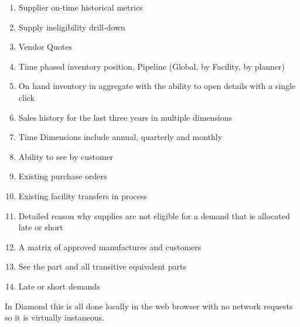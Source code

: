 \documentclass[letterpaper,10pt,english]{sphinxmanual}
\begin{document}
\begin{enumerate}
\item {} 
Supplier on-time historical metrics

\item {} 
Supply ineligibility drill-down

\item {} 
Vendor Quotes

\item {} 
Time phased inventory position, Pipeline (Global, by Facility, by
planner)

\item {} 
On hand inventory in aggregate with the ability to open details with
a single click

\item {} 
Sales history for the last three years in multiple dimensions

\item {} 
Time Dimensions include annual, quarterly and monthly

\item {} 
Ability to see by customer

\item {} 
Existing purchase orders

\item {} 
Existing facility transfers in process

\item {} 
Detailed reason why supplies are not eligible for a demand that is
allocated late or short

\item {} 
A matrix of approved manufactures and customers

\item {} 
See the part and all transitive equivalent parts

\item {} 
Late or short demands

\end{enumerate}

In Diamond this is all done locally in the web browser with no network
requests so it is virtually instaneous.
\end{document}

